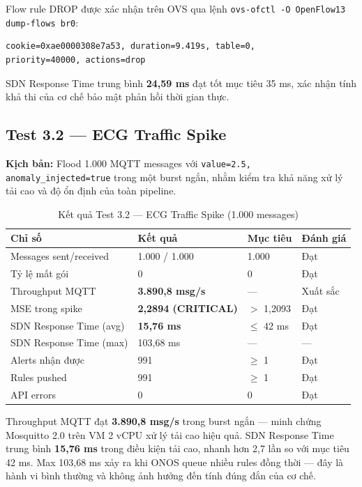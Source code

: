 Flow rule DROP được xác nhận trên OVS qua lệnh \texttt{ovs-ofctl -O OpenFlow13 dump-flows br0}:
\begin{lstlisting}[caption={Output OVS xác nhận DROP rule được cài đặt thành công}]
cookie=0xae0000308e7a53, duration=9.419s, table=0,
priority=40000, actions=drop
\end{lstlisting}

SDN Response Time trung bình \textbf{24,59 ms} đạt tốt mục tiêu 35 ms, xác nhận tính khả thi của cơ chế bảo mật phản hồi thời gian thực.

\subsection{Test 3.2 — ECG Traffic Spike}

\textbf{Kịch bản:} Flood 1.000 MQTT messages với \texttt{value=2.5, anomaly\_injected=true} trong một burst ngắn, nhằm kiểm tra khả năng xử lý tải cao và độ ổn định của toàn pipeline.

\begin{table}[htbp]
\caption{Kết quả Test 3.2 — ECG Traffic Spike (1.000 messages)}
\label{tab:test32}
\centering
\begin{tabular}{llll}
\toprule
\textbf{Chỉ số} & \textbf{Kết quả} & \textbf{Mục tiêu} & \textbf{Đánh giá} \\
\midrule
Messages sent/received   & 1.000 / 1.000         & 1.000      & Đạt \\
Tỷ lệ mất gói           & 0                     & 0          & Đạt \\
Throughput MQTT          & \textbf{3.890,8 msg/s} & —         & Xuất sắc \\
MSE trong spike          & \textbf{2,2894 (CRITICAL)} & $>$ 1,2093 & Đạt \\
SDN Response Time (avg)  & \textbf{15,76 ms}     & $\leq$ 42 ms & Đạt \\
SDN Response Time (max)  & 103,68 ms             & —          & — \\
Alerts nhận được         & 991                   & $\geq$ 1   & Đạt \\
Rules pushed             & 991                   & $\geq$ 1   & Đạt \\
API errors               & 0                     & 0          & Đạt \\
\bottomrule
\end{tabular}
\end{table}

Throughput MQTT đạt \textbf{3.890,8 msg/s} trong burst ngắn — minh chứng Mosquitto 2.0 trên VM 2 vCPU xử lý tải cao hiệu quả. SDN Response Time trung bình \textbf{15,76 ms} trong điều kiện tải cao, nhanh hơn 2,7 lần so với mục tiêu 42 ms. Max 103,68 ms xảy ra khi ONOS queue nhiều rules đồng thời — đây là hành vi bình thường và không ảnh hưởng đến tính đúng đắn của cơ chế.

